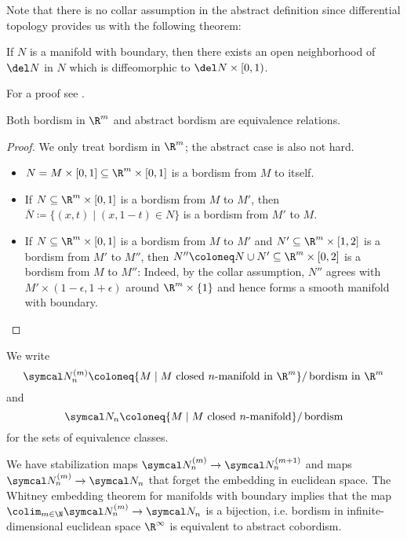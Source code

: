 Note that there is no collar assumption in the abstract definition since differential topology provides us with the following theorem:
\begin{theorem}\label{thm:collarnbhd}
	If $N$ is a manifold with boundary, then there exists an open neighborhood of $\del N$ in $N$ which is diffeomorphic to $\del N \times [0, 1)$.
\end{theorem}
For a proof see \cite[Theorem 9.25]{lee_introduction_2012}.
\begin{lemma}
	Both bordism in $\R^m$ and abstract bordism are equivalence relations.
\end{lemma}
\begin{proof}
	We only treat bordism in $\R^m$; the abstract case is also not hard.
	\begin{itemize}
		\item {} $N = M \times [0, 1] \subseteq \R^m \times [0, 1]$ is a bordism from $M$ to itself.
		\item {} If $N \subseteq \R^m \times [0, 1]$ is a bordism from $M$ to $M'$, then $\overline{N} \coloneq \{(x, t) \mid (x, 1 - t) \in N\}$ is a bordism from $M'$ to $M$.
		\item {} If $N \subseteq \R^m \times [0, 1]$ is a bordism from $M$ to $M'$ and $N' \subseteq \R^m \times [1, 2]$ is a bordism from $M'$ to $M''$, then $N'' \coloneq N \cup N' \subseteq \R^m \times [0, 2]$ is a bordism from $M$ to $M''$:
			Indeed, by the collar assumption, $N''$ agrees with $M' \times (1 - \epsilon, 1 + \epsilon)$ around $\R^m \times \{1\}$ and hence forms a smooth manifold with boundary.
			\qedhere
	\end{itemize}
\end{proof}
We write 
\begin{equation*}
	\Bord_n^{(m)} \coloneq \{M \mid M \text{ closed } n \text{-manifold in } \R^m\} /\,\text{bordism in } \R^m
\end{equation*}
and 
\begin{equation*}
	\Bord_n \coloneq \{M \mid M \text{ closed } n \text{-manifold}\} /\,\text{bordism}
\end{equation*}
for the sets of equivalence classes.

We have stabilization maps $\Bord_n^{(m)} \to \Bord_n^{(m + 1)}$ and maps $\Bord_n^{(m)} \to \Bord_n$ that forget the embedding in euclidean space.
The Whitney embedding theorem for manifolds with boundary implies that the map $\colim_{m \in \N} \Bord_n^{(m)} \to \Bord_n$ is a bijection, i.e. bordism in infinite-dimensional euclidean space $\R^\infty$ is equivalent to abstract cobordism.

